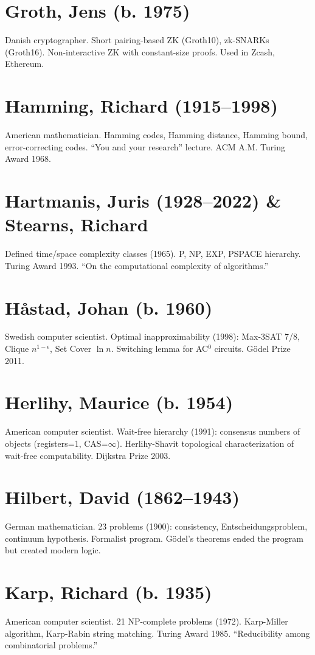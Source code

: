 \section*{Groth, Jens (b. 1975)}
Danish cryptographer. Short pairing-based ZK (Groth10), zk-SNARKs (Groth16). Non-interactive ZK with constant-size proofs. Used in Zcash, Ethereum.

\section*{Hamming, Richard (1915--1998)}
American mathematician. Hamming codes, Hamming distance, Hamming bound, error-correcting codes. ``You and your research'' lecture. ACM A.M. Turing Award 1968.

\section*{Hartmanis, Juris (1928--2022) \& Stearns, Richard}
Defined time/space complexity classes (1965). P, NP, EXP, PSPACE hierarchy. Turing Award 1993. ``On the computational complexity of algorithms.''

\section*{Håstad, Johan (b. 1960)}
Swedish computer scientist. Optimal inapproximability (1998): Max-3SAT 7/8, Clique $n^{1-\epsilon}$, Set Cover $\ln n$. Switching lemma for AC$^0$ circuits. G\"odel Prize 2011.

\section*{Herlihy, Maurice (b. 1954)}
American computer scientist. Wait-free hierarchy (1991): consensus numbers of objects (registers=1, CAS=$\infty$). Herlihy-Shavit topological characterization of wait-free computability. Dijkstra Prize 2003.

\section*{Hilbert, David (1862--1943)}
German mathematician. 23 problems (1900): consistency, Entscheidungsproblem, continuum hypothesis. Formalist program. Gödel's theorems ended the program but created modern logic.

\section*{Karp, Richard (b. 1935)}
American computer scientist. 21 NP-complete problems (1972). Karp-Miller algorithm, Karp-Rabin string matching. Turing Award 1985. ``Reducibility among combinatorial problems.''

